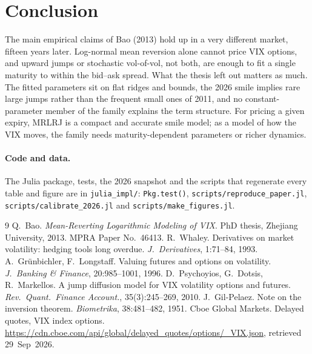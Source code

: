 \documentclass[10pt,twocolumn]{article}
\begin{document}
\section{Conclusion}
The main empirical claims of Bao (2013) hold up in a very different market, fifteen
years later. Log-normal mean reversion alone cannot price VIX options, and upward
jumps or stochastic vol-of-vol, not both, are enough to fit a single maturity to
within the bid--ask spread. What the thesis left out matters as much. The fitted
parameters sit on flat ridges and bounds, the 2026 smile implies rare large jumps
rather than the frequent small ones of 2011, and no constant-parameter member of
the family explains the term structure. For pricing a given expiry, MRLRJ is a
compact and accurate smile model; as a model of how the VIX moves, the family needs
maturity-dependent parameters or richer dynamics.

\paragraph{Code and data.} {\raggedright The Julia package, tests, the 2026 snapshot and the
scripts that regenerate every table and figure are in \texttt{julia\_impl/}:
\texttt{Pkg.test()}, \texttt{scripts/reproduce\_paper.jl},
\texttt{scripts/calibrate\_2026.jl} and \texttt{scripts/make\_figures.jl}.\par}

{\footnotesize
\begin{thebibliography}{9}
 Q.~Bao. \emph{Mean-Reverting Logarithmic Modeling of VIX}. PhD
thesis, Zhejiang University, 2013. MPRA Paper No.~46413.
 R.~Whaley. Derivatives on market volatility: hedging tools long
overdue. \emph{J.\ Derivatives}, 1:71--84, 1993.
 A.~Gr\"unbichler, F.~Longstaff. Valuing futures and options on
volatility. \emph{J.\ Banking \& Finance}, 20:985--1001, 1996.
 D.~Psychoyios, G.~Dotsis, R.~Markellos. A jump diffusion
model for VIX volatility options and futures. \emph{Rev.\ Quant.\ Finance Account.},
35(3):245--269, 2010.
 J.~Gil-Pelaez. Note on the inversion theorem.
\emph{Biometrika}, 38:481--482, 1951.
 Cboe Global Markets. Delayed quotes, VIX index options.
\url{https://cdn.cboe.com/api/global/delayed_quotes/options/_VIX.json},
retrieved 29~Sep~2026.
\end{thebibliography}}
\end{document}

